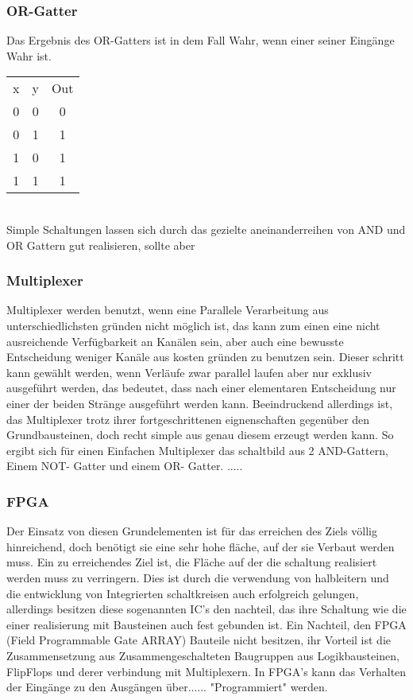 \documentclass[conference]{IEEEtran}
\begin{document}
\subsubsection{OR-Gatter}
Das Ergebnis des OR-Gatters ist in dem Fall Wahr, wenn einer seiner Eingänge Wahr ist.\\
\begin{tabular}[h]{ccc}
x&y&Out\\
0&0&0\\
0&1&1\\
1&0&1\\
1&1&1\\
\end{tabular}
\\Simple Schaltungen lassen sich durch das gezielte aneinanderreihen von AND und OR Gattern gut realisieren, sollte aber 
\subsubsection{Multiplexer}
Multiplexer werden benutzt, wenn eine Parallele Verarbeitung aus unterschiedlichsten gründen nicht möglich ist, das kann zum einen eine nicht ausreichende Verfügbarkeit an Kanälen sein, aber auch eine bewusste Entscheidung weniger Kanäle aus kosten gründen zu benutzen sein. Dieser schritt kann gewählt werden, wenn Verläufe zwar parallel laufen aber nur exklusiv ausgeführt werden, das bedeutet, dass nach einer elementaren Entscheidung nur einer der beiden Stränge ausgeführt werden kann. Beeindruckend allerdings ist, das Multiplexer trotz ihrer fortgeschrittenen eignenschaften gegenüber den Grundbausteinen, doch recht simple aus genau diesem erzeugt werden kann. So ergibt sich für einen Einfachen Multiplexer das schaltbild aus 2 AND-Gattern, Einem NOT- Gatter und einem OR- Gatter. .....
\subsubsection{FPGA}
Der Einsatz von diesen Grundelementen ist für das erreichen des Ziels völlig hinreichend, doch benötigt sie eine sehr hohe fläche, auf der sie Verbaut werden muss. Ein zu erreichendes Ziel ist, die Fläche auf der die schaltung realisiert werden muss zu verringern. Dies ist durch die verwendung von halbleitern und die entwicklung von Integrierten schaltkreisen auch erfolgreich gelungen, allerdings besitzen diese sogenannten IC's den nachteil, das ihre Schaltung wie die einer realisierung mit Bausteinen auch fest gebunden ist. Ein Nachteil, den FPGA (Field Programmable Gate ARRAY) Bauteile nicht besitzen, ihr Vorteil ist die Zusammensetzung aus Zusammengeschalteten Baugruppen aus Logikbausteinen, FlipFlops und derer verbindung mit Multiplexern. In FPGA's kann das Verhalten der Eingänge zu den Ausgängen über...... "Programmiert" werden.
\end{document}
